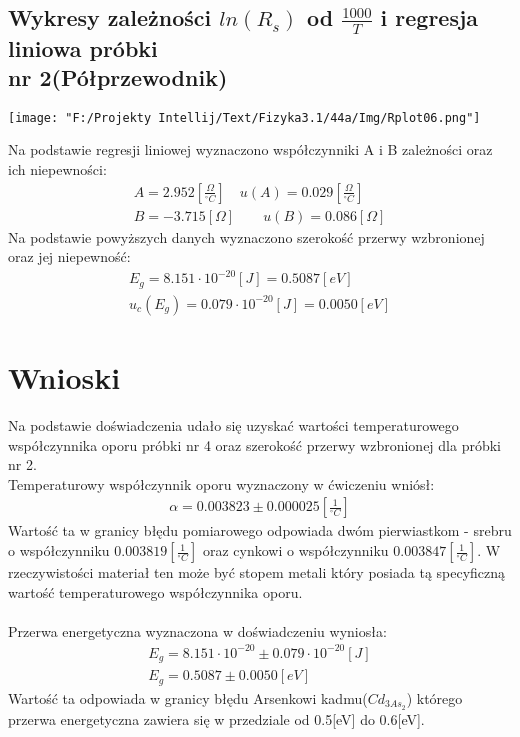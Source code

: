 \documentclass[11pt]{article}
\begin{document}
    \subsection*{Wykresy zależności $ln(R_s)$ od $\frac{1000}{T}$ i regresja liniowa próbki\\ nr 2(Półprzewodnik)}
    \begin{center}
        \texttt{[image: "F:/Projekty Intellij/Text/Fizyka3.1/44a/Img/Rplot06.png"]}
    \end{center}
    Na podstawie regresji liniowej wyznaczono współczynniki A i B zależności oraz ich niepewności:
    \begin{gather*}
        A=2.952[\frac{\Omega}{^\circ C}]\quad u(A)=0.029[\frac{\Omega}{^\circ C}]\\
        B=-3.715[\Omega]\quad\quad u(B)=0.086[\Omega]
    \end{gather*}
    Na podstawie powyższych danych wyznaczono szerokość przerwy wzbronionej oraz jej niepewność:
    \begin{gather*}
        E_g=8.151\cdot 10^{-20}[J]=0.5087[eV]\\
        u_c(E_g)=0.079\cdot 10^{-20}[J]=0.0050[eV]
    \end{gather*}

    \newpage
    \section{Wnioski}
    Na podstawie doświadczenia udało się uzyskać wartości temperaturowego współczynnika oporu próbki nr 4 oraz
    szerokość przerwy wzbronionej dla próbki nr 2.\\
    Temperaturowy współczynnik oporu wyznaczony w ćwiczeniu wniósł:
    \begin{gather*}
        \alpha=0.003823\pm0.000025[\frac{1}{^\circ C}]
    \end{gather*}
    \indent Wartość ta w granicy błędu pomiarowego odpowiada dwóm pierwiastkom - srebru o współczynniku $0.003819[\frac{1}{^\circ C}]$
    oraz cynkowi o współczynniku $0.003847[\frac{1}{^\circ C}]$. W rzeczywistości materiał ten może być stopem metali który posiada
    tą specyficzną wartość temperaturowego współczynnika oporu.\\\\
    Przerwa energetyczna wyznaczona w doświadczeniu wyniosła:
    \begin{gather*}
        E_g=8.151\cdot 10^{-20}\pm 0.079\cdot 10^{-20}[J]\\
        E_g=0.5087\pm 0.0050[eV]
    \end{gather*}
    \indent Wartość ta odpowiada w granicy błędu Arsenkowi kadmu($Cd_{3As_2}$) którego przerwa energetyczna zawiera się w przedziale
    od 0.5[eV] do 0.6[eV].
\end{document}
